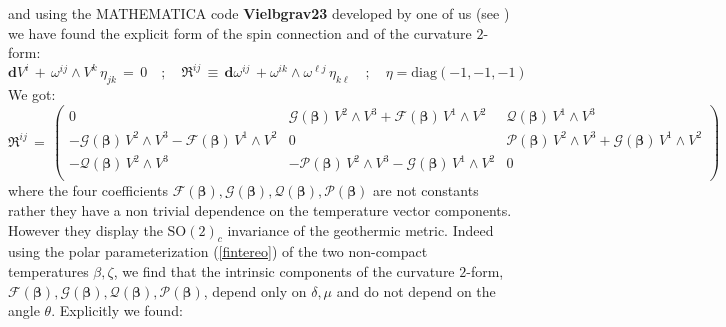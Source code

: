 \documentclass[10pt,a4paper]{article}
\begin{document}
and using the MATHEMATICA code \textbf{Vielbgrav23} developed by one of us (see \cite{fre2023book}) we have found
the explicit form of the spin connection and of the curvature $2$-form:
\begin{equation}\label{definitori}
  \mathbf{d}V^i \, + \, \omega^{ij}\wedge V^k\,\eta_{jk} \, = \, 0 \quad ; \quad \mathfrak{R}^{ij} \, \equiv \,
   \mathbf{d}\omega^{ij} \, + \omega^{ik}\wedge \omega^{\ell j} \, \eta_{k\ell} \quad ; \quad \eta= \text{diag}(-1,-1,-1)
\end{equation}
We got:
\begin{equation}\label{curvasinistra}
  \mathfrak{R}^{ij} \, = \, \left(
\begin{array}{ccc}
 0 & \mathcal{G}(\boldsymbol{\beta})\, V^2\wedge V^3 +\mathcal{F}(\boldsymbol{\beta}) \, V^1\wedge V^2 & \mathcal{Q}(\boldsymbol{\beta})\, V^1\wedge
   V^3 \\
 -\mathcal{G}(\boldsymbol{\beta})\, V^2\wedge V^3-\mathcal{F}(\boldsymbol{\beta})\, V^1\wedge V^2 & 0 & \mathcal{P}(\boldsymbol{\beta})\, V^2\wedge
   V^3+\mathcal{G}(\boldsymbol{\beta})\, V^1\wedge V^2 \\
 -\mathcal{Q}(\boldsymbol{\beta})\, V^2\wedge V^3 & -\mathcal{P}(\boldsymbol{\beta})\, V^2\wedge V^3-\mathcal{G}(\boldsymbol{\beta})\, V^1\wedge V^2
   & 0 \\
\end{array}
\right)
\end{equation}
where the four coefficients $\mathcal{F}(\boldsymbol{\beta}),\mathcal{G}(\boldsymbol{\beta}),\mathcal{Q}(\boldsymbol{\beta}),
\mathcal{P}(\boldsymbol{\beta})$ are not constants rather they have a non trivial dependence on the temperature vector components. However they  display the $\mathrm{SO(2)}_c$ invariance of the geothermic metric. Indeed using the polar parameterization (\ref{fintereo}) of the  two non-compact temperatures $\beta,\zeta$, we find that the intrinsic components of the curvature $2$-form, $\mathcal{F}(\boldsymbol{\beta}),\mathcal{G}(\boldsymbol{\beta}),\mathcal{Q}(\boldsymbol{\beta}),
\mathcal{P}(\boldsymbol{\beta})$,  depend only on $\delta,\mu$ and do not depend on the angle $\theta$.
Explicitly we found:
\end{document}
